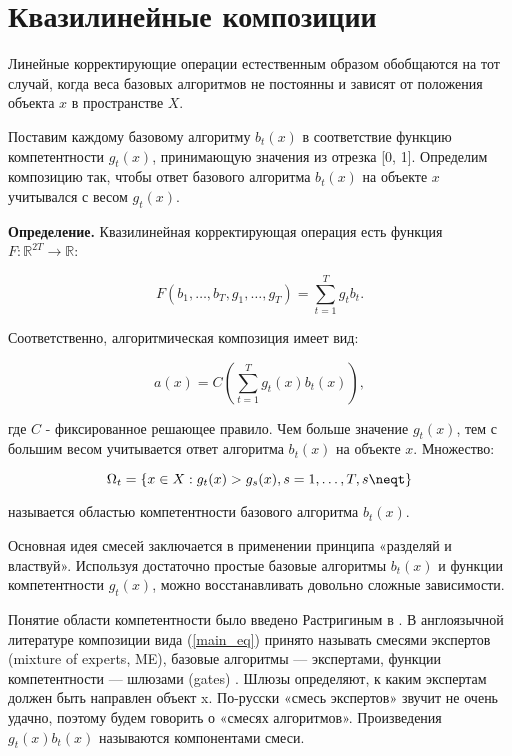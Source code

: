 \section{Квазилинейные композиции}

Линейные корректирующие операции естественным образом обобщаются на тот случай, когда веса базовых алгоритмов не постоянны и зависят от положения объекта $x$ в пространстве $X$.

Поставим каждому базовому алгоритму $b_{t}(x)$ в соответствие функцию компетентности $g_{t}(x)$, принимающую значения из отрезка [0, 1]. Определим композицию так, чтобы ответ базового алгоритма $b_{t}(x)$ на объекте $x$ учитывался с весом $g_{t}(x)$.

\textbf{Определение.} Квазилинейная корректирующая операция есть функция $F: \mathbb{R}^{2T} \rightarrow \mathbb{R}$:

\begin{equation}
    F(b_{1}, \dots, b_{T}, g_{1}, \dots, g_{T}) = \sum_{t=1}^{T}g_{t} b_{t}.
    \label{main_eq}
\end{equation}

Соответственно, алгоритмическая композиция имеет вид:

\begin{equation*}
    a(x) = C(\sum_{t=1}^{T}g_{t}(x)b_{t}(x)),
\end{equation*}

где $C$ - фиксированное решающее правило. Чем больше значение $g_{t}(x)$, тем с большим весом учитывается ответ алгоритма $b_{t}(x)$ на объекте $x$. Множество:

\begin{equation*}
    \Omega_{t} = \{x\in X: g_{t}(x) > g_{s}(x), s = 1, \dots, T, s \neqt\}
\end{equation*}

называется областью компетентности базового алгоритма $b_{t}(x)$.

Основная идея смесей заключается в применении принципа «разделяй и властвуй». Используя достаточно простые базовые алгоритмы $b_{t}(x)$ и функции компетентности $g_{t}(x)$, можно восстанавливать довольно сложные зависимости.

Понятие области компетентности было введено Растригиным в \cite{растригин1981коллективные}. В англоязычной литературе композиции вида (\ref{main_eq}) принято называть смесями экспертов
(mixture of experts, ME), базовые алгоритмы — экспертами, функции компетентности — шлюзами (gates) \cite{jacobs1991adaptive}. Шлюзы определяют, к каким экспертам должен быть
направлен объект x. По-русски «смесь экспертов» звучит не очень удачно, поэтому
будем говорить о «смесях алгоритмов». Произведения $g_{t}(x)b_{t}(x)$ называются компонентами смеси.

